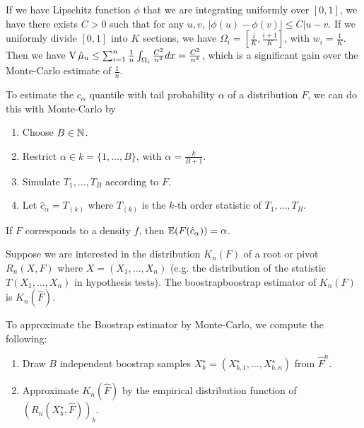 \begin{thm}
  \label{sec:monte-carlo-method-10}
  If we have Lipschitz function $\phi$ that we are integrating uniformly
  over $[0, 1]$, we have there exists $C > 0$ such that for any $u,
  v$, $|\phi(u) - \phi(v)| \leq C |u - v$.  If we uniformly divide
  $[0, 1]$ into $K$ sections, we have $\Omega_{i} = [\frac{i}{K},
  \frac{i+1}{K}]$, with $w_{i} = \frac{1}{K}$.  Then we have $\operatorname*{V} \hat
  \mu_{u} \leq \sum_{i=1}^{n} \frac{1}{n} \int_{\Omega_{i}}^{}
  \frac{C^{2}}{n^{2}} dx = \frac{C^{2}}{n^{3}}$, which is a significant
  gain over the Monte-Carlo estimate of $\frac{1}{n}$.
\end{thm}


\begin{defn}
  \label{sec:monte-carlo-method-11}
  To estimate the $c_{\alpha}$ quantile with tail probability $\alpha$
  of a distribution $F$, we can do this with Monte-Carlo by
  \begin{enumerate}
  \item Choose $B \in \mathbb{N}$.
  \item Restrict $\alpha \in k = \{ 1, \dots, B \} $, with $\alpha =
    \frac{k}{B+1} $.
  \item Simulate $T_{1}, \dots, T_{B}$ according to $F$.
  \item Let $\hat c_{\alpha} = T_{(k)}$ where $T_{(k)}$ is the $k$-th
    order statistic of $T_{1}, \dots, T_{B}$.
  \end{enumerate}
\end{defn}

\begin{thm}
  \label{sec:monte-carlo-method-12}
  If $F$ corresponds to a density $f$, then $\E{F(\hat c_{\alpha})} = \alpha$.
\end{thm}

\begin{defn}
  \label{sec:monte-carlo-method-13}
  Suppose we are interested in the distribution $K_{n}(F)$ of a root
  or pivot $R_{n}(X, F)$ where $X  = (X_{1}, \dots, X_{n})$ (e.g. the
  distribution of the statistic $T(X_{1}, \dots, X_{n})$ in hypothesis
  tests).  The boostrapboostrap estimator of $K_{n}(F)$is $K_{n}(\hat F)$.
\end{defn}

\begin{defn}
  \label{sec:monte-carlo-method-14}
  To approximate the Boostrap estimator by Monte-Carlo, we compute the
  following:
  \begin{enumerate}
  \item Draw $B$ independent boostrap samples $X^{\star}_{b} = (X_{b,
      1}^{\star}, \dots, X_{b, n}^{\star})$ from $\hat F^{n}$.
  \item Approximate $K_{n}(\hat F)$ by the empirical distribution
    function of $(R_{n}(X^{\star}_{b}, \hat F))_{b}$.
  \end{enumerate}
\end{defn}

